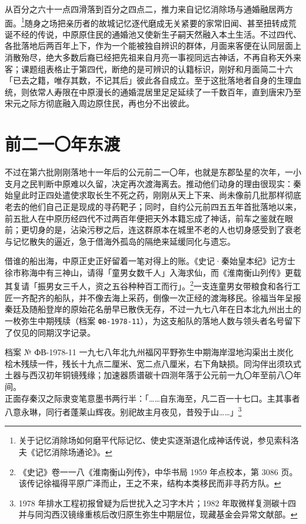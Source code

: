 从百分之六十一点四滑落到百分之四点二，推力来自记忆消除场与通婚融居两方面。\footnote{关于记忆消除场如何磨平代际记忆、使史实逐渐退化成神话传说，参见索科洛夫《记忆消除场通论》。}随身之场把亲历者的故城记忆逐代磨成无关紧要的家常旧闻、甚至扭转成荒诞不经的传说，中原原住民的通婚池又使新生子嗣天然融入本土生活。不过四代、各批落地后两百年上下，作为一个能被独自辨识的群体，月面来客便在认同层面上消散殆尽，绝大多数后裔已经把先祖来自月亮一事视同远古神话，不再自称天外来客；课题组表格止于第四代，断绝的是可辨识的认籍标识，刚好和月面简二十六「已去之籍，唯存其数，不记其后」彼此各自成立。至于这批落地者自身的生理血统，则依常人寿限在中原漫长的通婚混居里足足延续了一千数百年，直到唐宋乃至宋元之际方彻底融入周边原住民，再也分不出彼此。

\section{前二一〇年东渡}

不过在第六批刚刚落地十一年后的公元前二一〇年，也就是东郡坠星的次年，一小支月之民判断中原难以久留，决定再次渡海离去。推动他们动身的理由很现实：秦始皇此时正四处遣使求取长生不死之药，刚刚从天上下来、尚未像前几批那样彻底老去的他们自己正是现成的寻药靶子；同时，自约公元前四五五年首批落地以来，前五批人在中原历经四代不过两百年便把天外本籍忘成了神话，前车之鉴就在眼前；更切身的是，沾染污秽之后，连这群原本在城里不老的人也切身感受到了衰老与记忆散失的逼近，急于借海外孤岛的隔绝来延缓同化与遗忘。

借谁的船出海，中原正史正好留着一笔对得上的账。《史记·秦始皇本纪》记方士徐市称海中有三神山，请得「童男女数千人」入海求仙，而《淮南衡山列传》更载其复请「振男女三千人，资之五谷种种百工而行」。\footnote{《史记》卷一一八《淮南衡山列传》，中华书局 1959 年点校本，第 3086 页。该传记徐福得平原广泽而止，王之不来，结构本类移民而非寻药方队。}一支连童男女带粮食和各行工匠一齐配齐的船队，并不像去海上采药，倒像一次正经的渡海移民。徐福当年呈报秦廷及随船登岸的原始花名册早已散佚无存，不过一九七八年在日本北九州出土的一枚弥生中期残牍（档案 \texttt{ФВ-1978-11}），为这支船队的落地人数与领头者名号留下了仅见的同期汉字记录。

\begin{archive}[内部参考]{档案 № ФВ-1978-11}
一九七八年北九州福冈平野弥生中期海岸湿地沟渠出土炭化桧木残牍一件，残长十九点二厘米、宽二点八厘米，右下角缺损。同沟伴出须玖式土器与西汉初年铜镜残缘；加速器质谱碳十四测年落于公元前一九〇年至前八〇年间。\\
正面存秦汉之际隶变笔意墨书两行半：「……自东海至，凡二百一十七口。主其事者八意永琳，同行者蓬莱山辉夜。别祀故主月夜见，昔殁于山……」\footnote{1978 年排水工程初报曾疑为后世扰入之习字木片；1982 年取微样复测碳十四并与同沟西汉镜缘重核后改归原生弥生中期层位，现藏基金会异常文献部。}
\end{archive}

